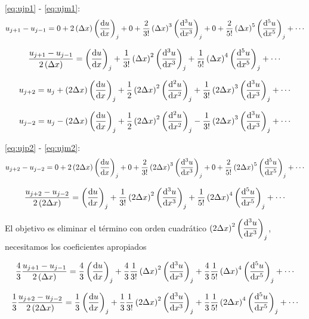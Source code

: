 \documentclass{article}
\begin{document}
\eqref{eq:ujp1} - \eqref{eq:ujm1}:
\begin{equation}
u_{j+1} - u_{j-1} = 0 + 2\Dx\derord{u}{x} + 0 + \frac2{3!}\Dx^3\derord[3]{u}{x} + 0 + \frac2{5!}\Dx^5\derord[5]{u}{x} + \cdots
\label{eq:ujp1mujm1}
\end{equation}

\begin{equation}
\frac{u_{j+1} - u_{j-1}}{2\Dx} = \derord{u}{x} + \frac1{3!}\Dx^2\derord[3]{u}{x} + \frac1{5!}\Dx^4\derord[5]{u}{x} + \cdots
\end{equation}


\begin{equation}
u_{j+2} = u_j + \dDx\derord{u}{x} + \frac12\dDx^2\derord[2]{u}{x} + \frac1{3!}\dDx^3\derord[3]{u}{x} + \cdots
\label{eq:ujp2}
\end{equation}

\begin{equation}
u_{j-2} = u_j - \dDx\derord{u}{x} + \frac12\dDx^2\derord[2]{u}{x} - \frac1{3!}\dDx^3\derord[3]{u}{x} + \cdots
\label{eq:ujm2}
\end{equation}

\eqref{eq:ujp2} - \eqref{eq:ujm2}:
\begin{equation}
u_{j+2} - u_{j-2} = 0 + 2\dDx\derord{u}{x} + 0 + \frac2{3!}\dDx^3\derord[3]{u}{x} + 0 + \frac2{5!}\dDx^5\derord[5]{u}{x} + \cdots
\label{eq:ujp2mujm2}
\end{equation}

\begin{equation}
\frac{u_{j+2} - u_{j-2}}{2\dDx} = \derord{u}{x} + \frac1{3!}\dDx^2\derord[3]{u}{x} + \frac1{5!}\dDx^4\derord[5]{u}{x} + \cdots
\label{eq:ujp2mujm2_s}
\end{equation}

El objetivo es eliminar el término con orden cuadrático $\dDx^2\derord[3]{u}{x}$, necesitamos los coeficientes apropiados


\begin{equation}
\def\coef{\frac43}
\coef\frac{u_{j+1} - u_{j-1}}{2\Dx} = \coef\derord{u}{x} + \coef\frac1{3!}\Dx^2\derord[3]{u}{x} + \coef\frac1{5!}\Dx^4\derord[5]{u}{x} + \cdots
\label{eq:4tercios}
\end{equation}

\begin{equation}
\def\coef{\frac13}
\coef\frac{u_{j+2} - u_{j-2}}{2\dDx} = \coef\derord{u}{x} + \coef\frac1{3!}\dDx^2\derord[3]{u}{x} + \coef\frac1{5!}\dDx^4\derord[5]{u}{x} + \cdots
\label{eq:1tercio}
\end{equation}
\end{document}

